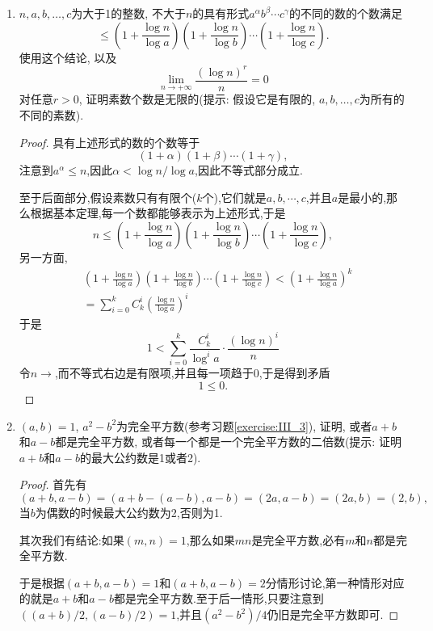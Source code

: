 \documentclass[12pt,a4paper]{book} %
\theoremstyle{remark}
\theoremstyle{example}
\theoremstyle{lemma}
\theoremstyle{corollary}
\numberwithin{theorem}{chapter}
\begin{document}
\begin{enumerate}
\item $n, a, b, \ldots, c$为大于1的整数, 不大于$n$的具有形式$a^{\alpha}b^{\beta} \cdots c^{\gamma}$的不同的数的个数满足
\[
\le (1 + \frac{\log{n}}{\log{a}})(1 + \frac{\log{n}}{\log{b}}) \cdots (1 + \frac{\log{n}}{\log{c}}).
\]
使用这个结论, 以及
\[
\lim_{n \rightarrow +\infty}{\frac{(\log{n})^r}{n}} = 0
\]
对任意$r > 0$, 证明素数个数是无限的(提示: 假设它是有限的, $a, b, \ldots, c$为所有的不同的素数).

\begin{proof}
具有上述形式的数的个数等于
\[
(1 + \alpha)(1 + \beta)\cdots(1+\gamma),
\]
注意到$a^{\alpha}\le n$,因此$\alpha < \log{n}/\log{a}$,因此不等式部分成立.

至于后面部分,假设素数只有有限个($k$个),它们就是$a,b,\cdots,c$,并且$a$是最小的,那么根据基本定理,每一个数都能够表示为上述形式,于是
\[
n \le (1 + \frac{\log{n}}{\log{a}})(1 + \frac{\log{n}}{\log{b}}) \cdots (1 + \frac{\log{n}}{\log{c}}),
\]
另一方面,
\[
\begin{aligned}
&(1 + \frac{\log{n}}{\log{a}})(1 + \frac{\log{n}}{\log{b}}) \cdots (1 + \frac{\log{n}}{\log{c}}) < (1 + \frac{\log{n}}{\log{a}})^k \\
&=\sum_{i=0}^{k}{C_k^i(\frac{\log{n}}{\log{a}})^i}
\end{aligned}
\]
于是
\[
1 < \sum_{i=0}^{k}{\frac{C_k^i}{\log^i{a}} \cdot \frac{(\log{n})^i}{n}}
\]
令$n \rightarrow$,而不等式右边是有限项,并且每一项趋于0,于是得到矛盾
\[
1 \le 0.
\]
\end{proof}

\item $(a, b) = 1$, $a^2 - b^2$为完全平方数(参考习题\ref{exercise:III_3}), 证明, 或者$a + b$和$a - b$都是完全平方数, 或者每一个都是一个完全平方数的二倍数(提示: 证明$a + b$和$a - b$的最大公约数是1或者2).

\begin{proof}
首先有
\[
(a+b,a-b) = (a+b-(a-b),a-b)=(2a,a-b)=(2a,b)=(2,b),
\]
当$b$为偶数的时候最大公约数为2,否则为1.

其次我们有结论:如果$(m,n)=1$,那么如果$mn$是完全平方数,必有$m$和$n$都是完全平方数.

于是根据$(a+b,a-b)=1$和$(a+b,a-b)=2$分情形讨论,第一种情形对应的就是$a+b$和$a-b$都是完全平方数.至于后一情形,只要注意到$((a+b)/2,(a-b)/2)=1$,并且$(a^2-b^2)/4$仍旧是完全平方数即可.
\end{proof}

\end{enumerate}
\end{document}
